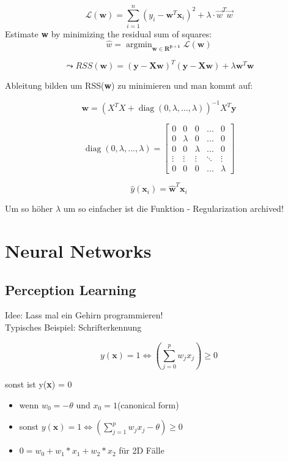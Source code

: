 \documentclass[11pt,a4paper]{article}
\DeclareMathOperator*{\argmin}{argmin}
\DeclareMathOperator*{\diag}{diag}
\begin{document}
\begin{flushleft}
$$\mathcal{L}(\textbf{w}) = \displaystyle\sum_{i=1}^{n}(y_i - \textbf{w}^T \textbf{x}_i)^2 + \lambda \cdot \overrightarrow{w}^T \overrightarrow{w}$$
Estimate \textbf{w} by minimizing the residual sum of squares:
$$\hat{w}= \argmin_{\mathbf{w\in R^{p+1}}} \mathcal{L}(\textbf{w}) $$

$$ \leadsto RSS(\textbf{w}) = (\textbf{y} -\textbf{Xw})^T (\textbf{y} -\textbf{Xw})+ \lambda \textbf{w}^T \textbf{w} $$

Ableitung bilden um RSS(\textbf{w}) zu minimieren und man kommt auf:

$$ \textbf{w} = (X^T X + \diag(0,\lambda, ..., \lambda))^{-1} X^T \textbf{y} $$

$$ \diag(0,\lambda, ..., \lambda) = \begin{bmatrix}
       0 & 0 & 0 & ... & 0 \\[0.3em]
       0 & \lambda & 0 & ... & 0 \\[0.3em]
       0 & 0 & \lambda & ... & 0 \\[0.3em]
       \vdots & \vdots & \vdots & \ddots & \vdots\\[0.3em]
       0 & 0 & 0 & ...& \lambda
     \end{bmatrix} $$
     
$$ \hat{y}(\textbf{x}_i) = \mathbf{\hat{w}}^T \textbf{x}_i $$

Um so höher $\lambda$ um so einfacher ist die Funktion - Regularization archived!

\section{Neural Networks}
\subsection{Perception Learning}
Idee: Lass mal ein Gehirn programmieren! \\
Typisches Beispiel: Schrifterkennung 

$$ y(\textbf{x}) = 1 \Leftrightarrow (\displaystyle\sum_{j=0}^p w_j x_j  ) \geq 0  $$

sonst ist y(\textbf{x}) = 0

\begin{itemize}
\item wenn $w_0 = -\theta$ und $x_0 = 1$(canonical form) 
\item sonst $ y(\textbf{x}) = 1 \Leftrightarrow (\displaystyle\sum_{j=1}^p w_j x_j - \theta ) \geq 0 $
\item $ 0 = w_0 + w_1 * x_1 + w_2 * x_2 $ für 2D Fälle
\end{itemize}


\end{flushleft}
\end{document}
